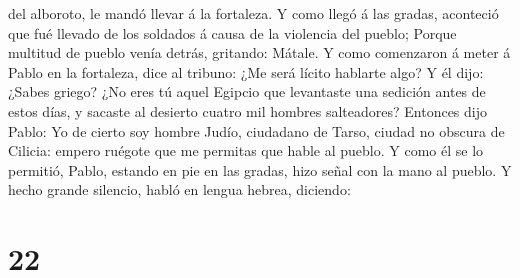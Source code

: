 del alboroto, le mandó llevar á la fortaleza.  Y como llegó
á las gradas, aconteció que fué llevado de los soldados á causa de la
violencia del pueblo;  Porque multitud de pueblo venía
detrás, gritando: Mátale.  Y como comenzaron á meter á
Pablo en la fortaleza, dice al tribuno: ¿Me será lícito hablarte algo? Y
él dijo: ¿Sabes griego?  ¿No eres tú aquel Egipcio que
levantaste una sedición antes de estos días, y sacaste al desierto
cuatro mil hombres salteadores?  Entonces dijo Pablo: Yo de
cierto soy hombre Judío, ciudadano de Tarso, ciudad no obscura de
Cilicia: empero ruégote que me permitas que hable al pueblo.
 Y como él se lo permitió, Pablo, estando en pie en las
gradas, hizo señal con la mano al pueblo. Y hecho grande silencio, habló
en lengua hebrea, diciendo:

\hypertarget{section-21}{%
\section{22}\label{section-21}}

